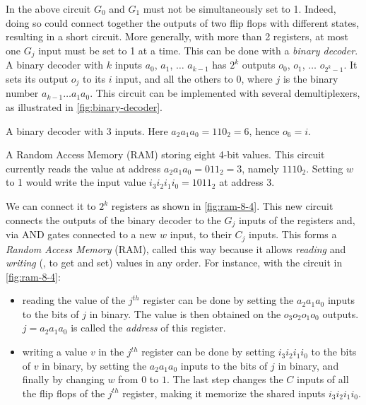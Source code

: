 In the above circuit $G_0$ and $G_1$ must not be simultaneously set to 1.
Indeed, doing so could connect together the outputs of two flip flops with
different states, resulting in a short circuit. More generally, with more than
2 registers, at most one $G_j$ input must be set to 1 at a time. This can be
done with a {\em binary decoder}. A binary decoder with $k$ inputs $a_0$,
$a_1$, $\ldots$ $a_{k-1}$ has $2^k$ outputs $o_0$, $o_1$, $\ldots$ $o_{2^k-1}$.
It sets its output $o_j$ to its $i$ input, and all the others to $0$, where $j$
is the binary number $a_{k-1}\ldots a_1 a_0$. This circuit can be implemented
with several demultiplexers, as illustrated in \cref{fig:binary-decoder}.

\begin{Figure}
  

  \caption{A binary decoder with 3 inputs. Here $a_2 a_1 a_0 = 110_2 = 6$,
  hence $o_6=i$.}\label{fig:binary-decoder}
\end{Figure}

\begin{Figure}
  

  \caption{A Random Access Memory (RAM) storing eight 4-bit values. This
    circuit currently reads the value at address $a_2a_1a_0=011_2=3$, namely
    $1110_2$. Setting $w$ to 1 would write the input value $i_3i_2i_1i_0=1011_2$
    at address $3$.}\label{fig:ram-8-4}
\end{Figure}

We can connect it to $2^k$ registers as shown in \cref{fig:ram-8-4}. This new
circuit connects the outputs of the binary decoder to the $G_j$ inputs of the
registers and, via AND gates connected to a new $w$ input, to their $C_j$
inputs. This forms a {\em Random Access Memory} (RAM), called this way because
it allows {\em reading} and {\em writing} (\ie, to get and set) values in any
order. For instance, with the circuit in \cref{fig:ram-8-4}:
\begin{itemize}
  \item reading the value of the $j^{th}$ register can be done  by setting the
  $a_2 a_1 a_0$ inputs to the bits of $j$ in binary. The value is then obtained
  on the $o_3 o_2 o_1 o_0$ outputs. $j = a_2 a_1 a_0$ is called the {\em
  address} of this register.

  \item writing a value $v$ in the $j^{th}$ register can be done by setting
  $i_3 i_2 i_1 i_0$ to the bits of $v$ in binary, by setting the $a_2 a_1 a_0$
  inputs to the bits of $j$ in binary, and finally by changing $w$ from $0$ to
  $1$. The last step changes the $C$ inputs of all the flip flops of the
  $j^{th}$ register, making it memorize the shared inputs $i_3 i_2 i_1 i_0$.
\end{itemize}

